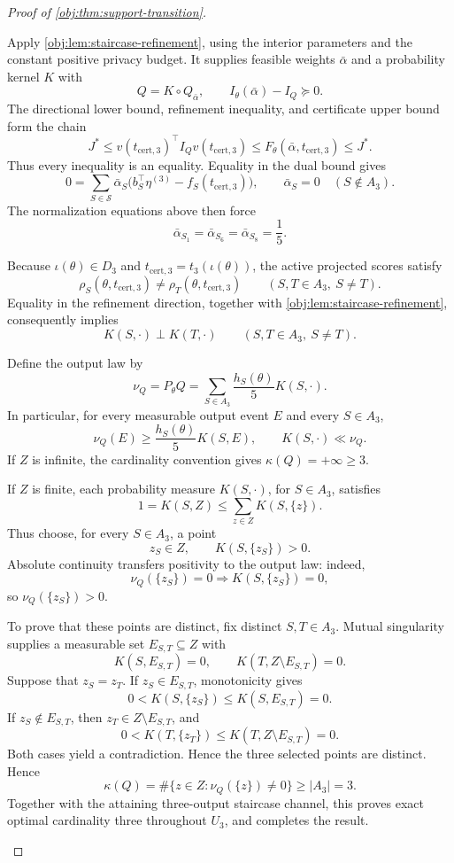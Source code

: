 \documentclass[11pt]{article}
\begin{document}
\begin{proof}[Proof of \cref{obj:thm:support-transition}]
\begin{enumerate}
Apply \cref{obj:lem:staircase-refinement}, using the interior parameters and the constant positive privacy budget. It supplies feasible weights \(\bar\alpha\) and a probability kernel \(K\) with
\[
Q=K\circ Q_{\bar\alpha},
\qquad
I_\theta(\bar\alpha)-I_Q\succeq0.
\]
The directional lower bound, refinement inequality, and certificate upper bound form the chain
\[
J^*
\le v(t_{\mathrm{cert},3})^\top I_Qv(t_{\mathrm{cert},3})
\le F_\theta(\bar\alpha,t_{\mathrm{cert},3})
\le J^*.
\]
Thus every inequality is an equality. Equality in the dual bound gives
\[
0=\sum_{S\in\mathcal S}\bar\alpha_S
 \bigl(b_S^\top\eta^{(3)}-f_S(t_{\mathrm{cert},3})\bigr),
\qquad
\bar\alpha_S=0\quad(S\notin A_3).
\]
The normalization equations above then force
\[
\bar\alpha_{S_1}=\bar\alpha_{S_6}=\bar\alpha_{S_8}=\frac15.
\]

Because \(\iota(\theta)\in D_3\) and
\(t_{\mathrm{cert},3}=t_3(\iota(\theta))\), the active projected scores satisfy
\[
\rho_S(\theta,t_{\mathrm{cert},3})
\ne\rho_T(\theta,t_{\mathrm{cert},3})
\qquad(S,T\in A_3,\ S\ne T).
\]
Equality in the refinement direction, together with
\cref{obj:lem:staircase-refinement}, consequently implies
\[
K(S,\cdot)\perp K(T,\cdot)
\qquad(S,T\in A_3,\ S\ne T).
\]

Define the output law by
\[
\nu_Q=P_\theta Q
=\sum_{S\in A_3}\frac{h_S(\theta)}5K(S,\cdot).
\]
In particular, for every measurable output event \(E\) and every \(S\in A_3\),
\[
\nu_Q(E)\ge\frac{h_S(\theta)}5K(S,E),
\qquad
K(S,\cdot)\ll\nu_Q.
\]
If \(Z\) is infinite, the cardinality convention gives
\(\kappa(Q)=+\infty\ge3\).

If \(Z\) is finite, each probability measure \(K(S,\cdot)\), for \(S\in A_3\), satisfies
\[
1=K(S,Z)\le\sum_{z\in Z}K(S,\{z\}).
\]
Thus choose, for every \(S\in A_3\), a point
\[
z_S\in Z,\qquad K(S,\{z_S\})>0.
\]
Absolute continuity transfers positivity to the output law: indeed,
\[
\nu_Q(\{z_S\})=0\Longrightarrow K(S,\{z_S\})=0,
\]
so \(\nu_Q(\{z_S\})>0\).

To prove that these points are distinct, fix distinct \(S,T\in A_3\). Mutual singularity supplies a measurable set \(E_{S,T}\subseteq Z\) with
\[
K(S,E_{S,T})=0,\qquad K(T,Z\setminus E_{S,T})=0.
\]
Suppose that \(z_S=z_T\). If \(z_S\in E_{S,T}\), monotonicity gives
\[
0<K(S,\{z_S\})\le K(S,E_{S,T})=0.
\]
If \(z_S\notin E_{S,T}\), then \(z_T\in Z\setminus E_{S,T}\), and
\[
0<K(T,\{z_T\})\le K(T,Z\setminus E_{S,T})=0.
\]
Both cases yield a contradiction. Hence the three selected points are distinct. Hence
\[
\kappa(Q)
=\#\{z\in Z:\nu_Q(\{z\})\ne0\}
\ge |A_3|=3.
\]
Together with the attaining three-output staircase channel, this proves exact optimal cardinality three throughout \(U_3\), and completes the result.
\end{enumerate}
\end{proof}
\end{document}
